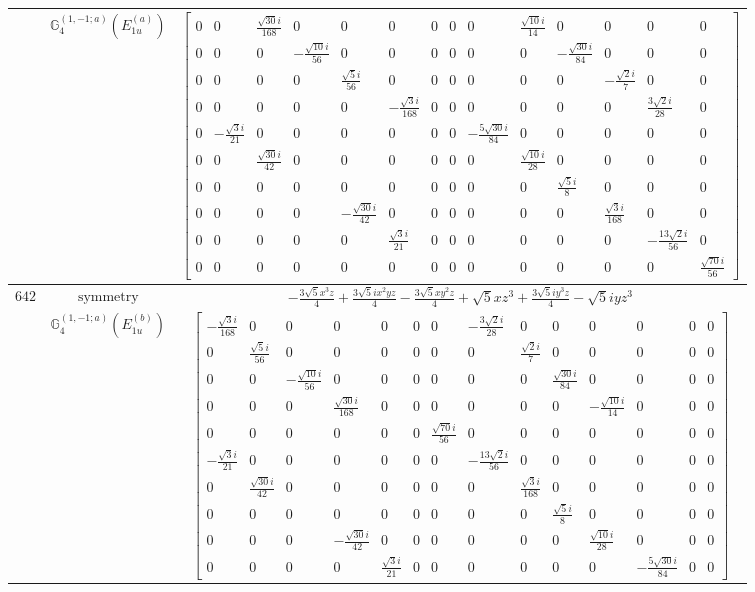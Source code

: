 \documentclass[fleqn,8pt,landscape]{jsarticle}
\begin{document}
\begin{longtable}{ccc}
$  $ & $ \mathbb{G}_{4}^{(1,-1;a)}(E_{1u}^{(a)}) $ & $ \begin{bmatrix} 0 & 0 & \frac{\sqrt{30} i}{168} & 0 & 0 & 0 & 0 & 0 & 0 & \frac{\sqrt{10} i}{14} & 0 & 0 & 0 & 0 \\ 0 & 0 & 0 & - \frac{\sqrt{10} i}{56} & 0 & 0 & 0 & 0 & 0 & 0 & - \frac{\sqrt{30} i}{84} & 0 & 0 & 0 \\ 0 & 0 & 0 & 0 & \frac{\sqrt{5} i}{56} & 0 & 0 & 0 & 0 & 0 & 0 & - \frac{\sqrt{2} i}{7} & 0 & 0 \\ 0 & 0 & 0 & 0 & 0 & - \frac{\sqrt{3} i}{168} & 0 & 0 & 0 & 0 & 0 & 0 & \frac{3 \sqrt{2} i}{28} & 0 \\ 0 & - \frac{\sqrt{3} i}{21} & 0 & 0 & 0 & 0 & 0 & 0 & - \frac{5 \sqrt{30} i}{84} & 0 & 0 & 0 & 0 & 0 \\ 0 & 0 & \frac{\sqrt{30} i}{42} & 0 & 0 & 0 & 0 & 0 & 0 & \frac{\sqrt{10} i}{28} & 0 & 0 & 0 & 0 \\ 0 & 0 & 0 & 0 & 0 & 0 & 0 & 0 & 0 & 0 & \frac{\sqrt{5} i}{8} & 0 & 0 & 0 \\ 0 & 0 & 0 & 0 & - \frac{\sqrt{30} i}{42} & 0 & 0 & 0 & 0 & 0 & 0 & \frac{\sqrt{3} i}{168} & 0 & 0 \\ 0 & 0 & 0 & 0 & 0 & \frac{\sqrt{3} i}{21} & 0 & 0 & 0 & 0 & 0 & 0 & - \frac{13 \sqrt{2} i}{56} & 0 \\ 0 & 0 & 0 & 0 & 0 & 0 & 0 & 0 & 0 & 0 & 0 & 0 & 0 & \frac{\sqrt{70} i}{56} \end{bmatrix} $ \\ \hline
$ 642 $ & $ \text{symmetry} $ & $ - \frac{3 \sqrt{5} x^{3} z}{4} + \frac{3 \sqrt{5} i x^{2} y z}{4} - \frac{3 \sqrt{5} x y^{2} z}{4} + \sqrt{5} x z^{3} + \frac{3 \sqrt{5} i y^{3} z}{4} - \sqrt{5} i y z^{3} $ \\
$  $ & $ \mathbb{G}_{4}^{(1,-1;a)}(E_{1u}^{(b)}) $ & $ \begin{bmatrix} - \frac{\sqrt{3} i}{168} & 0 & 0 & 0 & 0 & 0 & 0 & - \frac{3 \sqrt{2} i}{28} & 0 & 0 & 0 & 0 & 0 & 0 \\ 0 & \frac{\sqrt{5} i}{56} & 0 & 0 & 0 & 0 & 0 & 0 & \frac{\sqrt{2} i}{7} & 0 & 0 & 0 & 0 & 0 \\ 0 & 0 & - \frac{\sqrt{10} i}{56} & 0 & 0 & 0 & 0 & 0 & 0 & \frac{\sqrt{30} i}{84} & 0 & 0 & 0 & 0 \\ 0 & 0 & 0 & \frac{\sqrt{30} i}{168} & 0 & 0 & 0 & 0 & 0 & 0 & - \frac{\sqrt{10} i}{14} & 0 & 0 & 0 \\ 0 & 0 & 0 & 0 & 0 & 0 & \frac{\sqrt{70} i}{56} & 0 & 0 & 0 & 0 & 0 & 0 & 0 \\ - \frac{\sqrt{3} i}{21} & 0 & 0 & 0 & 0 & 0 & 0 & - \frac{13 \sqrt{2} i}{56} & 0 & 0 & 0 & 0 & 0 & 0 \\ 0 & \frac{\sqrt{30} i}{42} & 0 & 0 & 0 & 0 & 0 & 0 & \frac{\sqrt{3} i}{168} & 0 & 0 & 0 & 0 & 0 \\ 0 & 0 & 0 & 0 & 0 & 0 & 0 & 0 & 0 & \frac{\sqrt{5} i}{8} & 0 & 0 & 0 & 0 \\ 0 & 0 & 0 & - \frac{\sqrt{30} i}{42} & 0 & 0 & 0 & 0 & 0 & 0 & \frac{\sqrt{10} i}{28} & 0 & 0 & 0 \\ 0 & 0 & 0 & 0 & \frac{\sqrt{3} i}{21} & 0 & 0 & 0 & 0 & 0 & 0 & - \frac{5 \sqrt{30} i}{84} & 0 & 0 \end{bmatrix} $ \\ \hline

\end{longtable}
\end{document}
